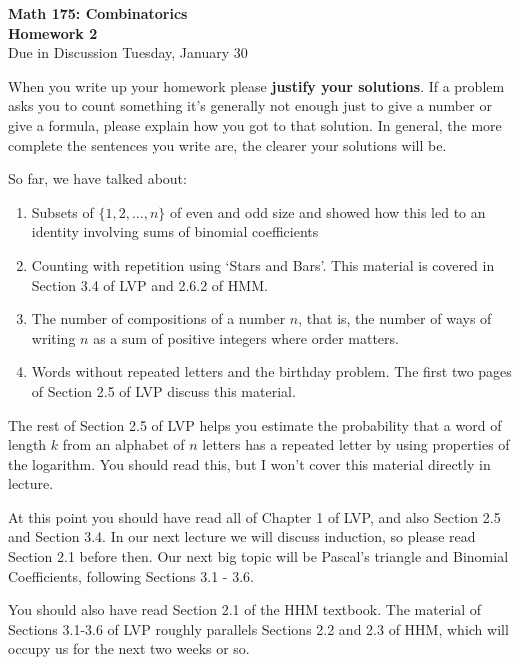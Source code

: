 \documentclass[11pt]{article}
\begin{document}
\begin{center}
{\Large \bf Math 175: Combinatorics} \\
{\Large \bf Homework 2}\\
{\Large Due in Discussion Tuesday, January 30\\
}
\end{center}

\vspace{5mm}

When you write up your homework please {\bf justify your solutions}.  If a problem asks you to count something it's generally not enough just to give a number or give a formula, please explain how you got to that solution.  In general, the more complete the sentences you write are, the clearer your solutions will be.  

So far, we have talked about:
\begin{enumerate} 
\item 
Subsets of $\{1,2,\ldots, n\}$ of even and odd size and showed how this led to an identity involving sums of binomial coefficients
\item 
Counting with repetition using `Stars and Bars'.  This material is covered in Section 3.4 of LVP and 2.6.2 of HMM. 
\item
The number of compositions of a number $n$, that is, the number of ways of writing $n$ as a sum of positive integers where order matters.
\item 
Words without repeated letters and the birthday problem.  The first two pages of Section 2.5 of LVP discuss this material. 
\end{enumerate} 

The rest of Section 2.5 of LVP  helps you estimate the probability that a word of length $k$ from an alphabet of $n$ letters has a repeated letter by using properties of the logarithm.  You should read this, but I won't cover this material directly in lecture.

At this point you should have read all of Chapter 1 of LVP, and also Section 2.5 and Section 3.4.  In our next lecture we will discuss induction, so please read Section 2.1 before then.  Our next big topic will be Pascal's triangle and Binomial Coefficients, following Sections 3.1 - 3.6.

You should also have read Section 2.1 of the HHM textbook.  The material of Sections 3.1-3.6 of LVP roughly parallels Sections 2.2 and 2.3 of HHM, which will occupy us for the next two weeks or so.

\newpage
\end{document}
